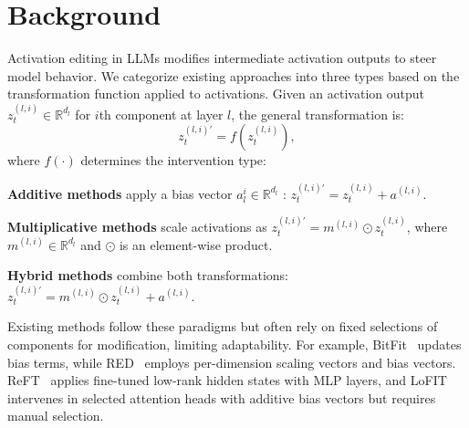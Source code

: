 \section{Background}
\label{sec:background}
Activation editing in LLMs modifies intermediate activation outputs to steer model behavior.
We categorize existing approaches into three types based on the transformation function applied to activations.
Given an activation output $z_t^{(l,i)} \in \mathbb{R}^{d_l}$ for $i$th component at layer $l$, the general transformation is:
\begin{equation}
    z_t^{(l,i)'} = f(z_t^{(l,i)}),
\end{equation}
where $f(\cdot)$ determines the intervention type:
\begin{compactitem}
\item \textbf{Additive methods} apply a bias vector $a^{i}_{l} \in \mathbb{R}^{d_l}$ : $z_t^{(l,i)'} = z_t^{(l,i)} + a^{(l,i)}$.
\item \textbf{Multiplicative methods} scale activations as $z_t^{(l,i)'} = m^{(l,i)} \odot z_t^{(l,i)}$, where $m^{(l,i)} \in \mathbb{R}^{d_l}$ and $\odot$ is an element-wise product.
\item \textbf{Hybrid methods} combine both transformations: $z_t^{(l,i)'} = m^{(l,i)} \odot z_t^{(l,i)} + a^{(l,i)}$.
\end{compactitem}

Existing methods follow these paradigms but often rely on fixed selections of components for modification, limiting adaptability.
For example, BitFit~\cite{ben-zaken-etal-2022-bitfit} updates bias terms, while RED~\cite{wu-etal-2024-advancing} employs per-dimension scaling vectors and bias vectors. ReFT~\cite{wu2024reft} applies fine-tuned low-rank hidden states with MLP layers, and LoFIT~\cite{yin2024lofit} intervenes in selected attention heads with additive bias vectors but requires manual selection.